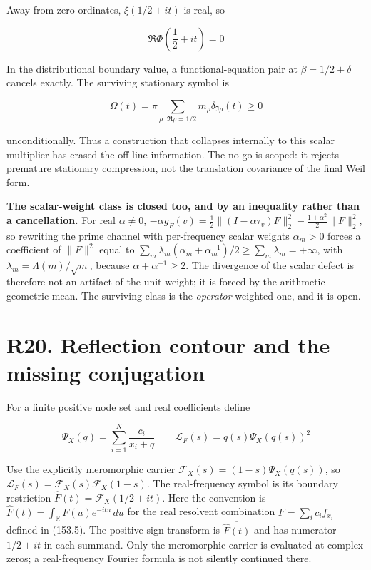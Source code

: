 \documentclass[
  11pt,
]{book}
\begin{document}
Away from zero ordinates, \(\xi(1/2+it)\) is real, so

\[
\Re\Phi\!\left(\frac12+it\right)=0
\tag{19.2}
\]

In the distributional boundary value, a functional-equation pair at
\(\beta=1/2\pm\delta\) cancels exactly. The surviving stationary symbol
is

\[
\Omega(t)=\pi\sum_{\rho:\,\Re\rho=1/2}
m_\rho\delta_{\Im\rho}(t)\ge0
\tag{19.3}
\]

unconditionally. Thus a construction that collapses internally to this
scalar multiplier has erased the off-line information. The no-go is
scoped: it rejects premature stationary compression, not the translation
covariance of the final Weil form.

\textbf{The scalar-weight class is closed too, and by an inequality
rather than a cancellation.} For real \(\alpha\neq0\),
\(-\alpha g_F(v)=\tfrac12\lVert(I-\alpha\tau_v)F\rVert_2^2-\tfrac{1+\alpha^2}2\lVert F\rVert_2^2\),
so rewriting the prime channel with per-frequency scalar weights
\(\alpha_m>0\) forces a coefficient of \(\lVert F\rVert^2\) equal to
\(\sum_m\lambda_m(\alpha_m+\alpha_m^{-1})/2\ge\sum_m\lambda_m=+\infty\),
with \(\lambda_m=\Lambda(m)/\sqrt m\), because
\(\alpha+\alpha^{-1}\ge2\). The divergence of the scalar defect is
therefore not an artifact of the unit weight; it is forced by the
arithmetic--geometric mean. The surviving class is the
\emph{operator}-weighted one, and it is open.

\section{R20. Reflection contour and the missing
conjugation}\label{r20.-reflection-contour-and-the-missing-conjugation}

For a finite positive node set and real coefficients define

\[
\Psi_X(q)=\sum_{i=1}^N\frac{c_i}{x_i+q}
\qquad
\mathscr L_F(s)=q(s)\Psi_X(q(s))^2
\tag{20.1}
\]

Use the explicitly meromorphic carrier
\(\mathcal F_X(s)=(1-s)\Psi_X(q(s))\), so
\(\mathscr L_F(s)=\mathcal F_X(s)\mathcal F_X(1-s)\). The real-frequency
symbol is its boundary restriction
\(\widehat F(t)=\mathcal F_X(1/2+it)\). Here the convention is
\(\widehat F(t)=\int_{\mathbb R}F(u)e^{-itu}\,du\) for the real
resolvent combination \(F=\sum_i c_if_{x_i}\) defined in (153.5). The
positive-sign transform is \(\overline{\widehat F(t)}\) and has
numerator \(1/2+it\) in each summand. Only the meromorphic carrier is
evaluated at complex zeros; a real-frequency Fourier formula is not
silently continued there.
\end{document}
